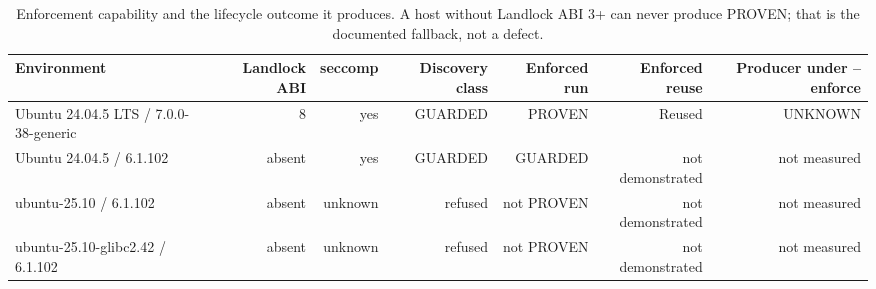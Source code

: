 \begin{table}[t]
\centering
\small
\caption{Enforcement capability and the lifecycle outcome it produces. A host without Landlock ABI 3+ can never produce PROVEN; that is the documented fallback, not a defect.}
\label{tab:capability}
\begin{tabular}{lrrrrrr}
\toprule
\textbf{Environment} & \textbf{Landlock ABI} & \textbf{seccomp} & \textbf{Discovery class} & \textbf{Enforced run} & \textbf{Enforced reuse} & \textbf{Producer under --enforce} \\
\midrule
Ubuntu 24.04.5 LTS / 7.0.0-38-generic & 8 & yes & GUARDED & PROVEN & Reused & UNKNOWN \\
Ubuntu 24.04.5 / 6.1.102 & absent & yes & GUARDED & GUARDED & not demonstrated & not measured \\
ubuntu-25.10 / 6.1.102 & absent & unknown & refused & not PROVEN & not demonstrated & not measured \\
ubuntu-25.10-glibc2.42 / 6.1.102 & absent & unknown & refused & not PROVEN & not demonstrated & not measured \\
\bottomrule
\end{tabular}
\end{table}

